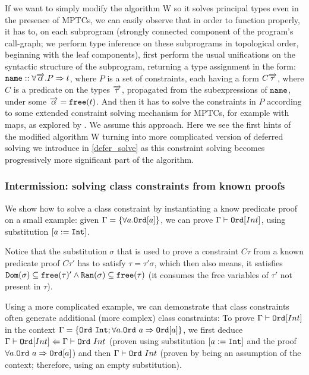 If we want to simply modify the algorithm W so it solves principal types even in the presence of MPTCs, we can easily observe that in order to function properly, it has to, on each subprogram (strongly connected component of the program's call-graph; we perform type inference on these subprograms in topological order, beginning with the leaf components), first perform the usual unifications on the syntactic structure of the subprogram, returning a type assignment in the form: $\mathtt{name} :: \forall \overrightarrow{\alpha} . P  \Rightarrow t$, where $P$ is a set of constraints, each having a form $C \overrightarrow{\tau}$, where $C$ is a predicate on the types $\overrightarrow{\tau}$, propagated from the subexpressions of $\mathtt{name}$, under some $\overrightarrow{\alpha} = \mathtt{free} (t)$. And then it has to solve the constraints in $P$ according to some extended constraint solving mechanism for MPTCs, for example with maps, as explored by \cite{jones2000type}. We assume this approach. Here we see the first hints of the modified algorithm W turning into more complicated version of deferred solving we introduce in \cref{defer_solve} as this constraint solving becomes progressively more significant part of the algorithm.

\subsubsection{Intermission: solving class constraints from known proofs}

We show how to solve a class constraint by instantiating a know predicate proof on a small example: given $\Gamma = \{\forall a . \mathtt{Ord} [a]\}$, we can prove $\Gamma \vdash \mathtt{Ord} [Int]$, using substitution $[a := \mathtt{Int}]$. \cite{jones1999typing}

Notice that the substitution $\sigma$ that is used to prove a constraint $C \tau$ from a known predicate proof $C \tau'$ has to satisfy $\tau = \tau' \sigma$, which then also means, it satisfies $\mathtt{Dom} (\sigma) \subseteq \mathtt{free} (\tau)' \land \mathtt{Ran} (\sigma) \subseteq \mathtt{free} (\tau)$ (it consumes the free variables of $\tau'$ not present in $\tau$).

Using a more complicated example, we can demonstrate that class constraints often generate additional (more complex) class constraints: To prove $\Gamma \vdash \mathtt{Ord} [Int]$ in the context $\Gamma = \{\mathtt{Ord}\ \mathtt{Int}; \forall a . \mathtt{Ord}\ a \Rightarrow \mathtt{Ord} [a]\}$, we first deduce $\Gamma \vdash \mathtt{Ord} [Int] \Leftarrow \Gamma \vdash \mathtt{Ord}\ Int$ (proven using substitution $[a := \mathtt{Int}]$ and the proof $\forall a . \mathtt{Ord}\ a \Rightarrow \mathtt{Ord} [a]$) and then $\Gamma \vdash \mathtt{Ord}\ Int$ (proven by being an assumption of the context; therefore, using an empty substitution).


